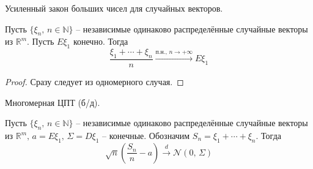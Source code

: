 \begin{theorem}
	Усиленный закон больших чисел для случайных векторов.

	Пусть $\{\xi_n,\, n \in \mathbb{N}\}$ -- независимые одинаково распределённые случайные векторы из $\mathbb{R}^m$. Пусть $E\xi_1$ конечно. Тогда
	\[\frac{\xi_1 + \cdots + \xi_n}{n} \stackrel{\text{п.н.},\, n \to +\infty}{\to} E\xi_1\]
\end{theorem}

\begin{proof}
	Сразу следует из одномерного случая.
\end{proof}

\begin{theorem}
	Многомерная ЦПТ (б/д).

	Пусть $\{\xi_n,\, n \in \mathbb{N}\}$ -- независимые одинаково распределённые случайные векторы из $\mathbb{R}^m,\, a = E\xi_1,\, \Sigma = D\xi_1$ -- конечные. Обозначим $S_n = \xi_1 + \cdots + \xi_n$. Тогда
	\[\sqrt{n}\left(\frac{S_n}{n} - a\right) \stackrel{d}{\to} \mathcal{N}(0,\, \Sigma)\]
\end{theorem}